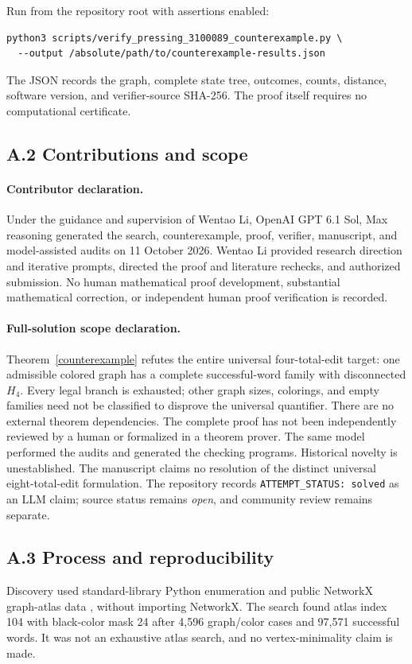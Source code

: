 \documentclass[11pt]{article}
\begin{document}
Run from the repository root with assertions enabled:
\begin{verbatim}
python3 scripts/verify_pressing_3100089_counterexample.py \
  --output /absolute/path/to/counterexample-results.json
\end{verbatim}
The JSON records the graph, complete state tree, outcomes, counts,
distance, software version, and verifier-source SHA-256.
The proof itself requires no computational certificate.

\subsection*{A.2 Contributions and scope}
\paragraph{Contributor declaration.}
Under the guidance and supervision of Wentao Li, OpenAI GPT 6.1 Sol,
Max reasoning generated the search, counterexample, proof, verifier,
manuscript, and model-assisted audits on 11 October 2026. Wentao Li
provided research direction and iterative prompts, directed the proof
and literature rechecks, and authorized submission. No human mathematical
proof development, substantial mathematical correction, or independent
human proof verification is recorded.

\paragraph{Full-solution scope declaration.}
Theorem~\ref{counterexample} refutes the entire universal four-total-edit
target: one admissible colored graph has a complete successful-word
family with disconnected $H_4$. Every legal branch is exhausted;
other graph sizes, colorings, and empty families need not be classified
to disprove the universal quantifier. There are no external theorem
dependencies. The complete proof has not been independently reviewed
by a human or formalized in a theorem prover. The same model performed
the audits and generated the checking programs. Historical novelty is
unestablished. The manuscript claims no resolution of the distinct
universal eight-total-edit formulation. The repository records
\texttt{ATTEMPT\_STATUS: solved} as an LLM claim; source status remains
\emph{open}, and community review remains separate.

\subsection*{A.3 Process and reproducibility}
Discovery used standard-library Python enumeration and public NetworkX
graph-atlas data \cite{atlas}, without importing NetworkX. The search
found atlas index 104 with black-color mask 24 after 4,596 graph/color
cases and 97,571 successful words. It was not an exhaustive atlas search,
and no vertex-minimality claim is made.
\end{document}
